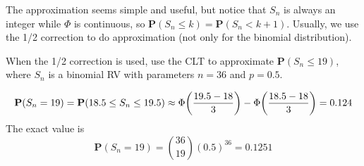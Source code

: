 \documentclass[device=normal, lang=en]{elegantbook}
\numberwithin{equation}{section}
\begin{document}
The approximation seems simple and useful, but notice that $S_n$ is always an integer while $\Phi$ is continuous, so $\mathbf{P}(S_n \leq k) = \mathbf{P}(S_n < k + 1)$. Usually, we use the 1/2 correction to do approximation (not only for the binomial distribution).
\begin{example}
    When the 1/2 correction is used, use the CLT to approximate $\mathbf{P}(S_n \leq 19)$, where $S_n$ is a binomial RV with parameters $n = 36$ and $p = 0.5$.
\end{example}
\begin{solution}
    \begin{equation}
        \mathbf{P}(S_n = 19) = \mathbf{P}(18.5 \leq S_n \leq 19.5) \approx \Phi\qty(\frac{19.5 - 18}{3}) - \Phi\qty(\frac{18.5 - 18}{3}) = 0.124
    \end{equation}
    The exact value is
    \begin{equation}
        \mathbf{P}(S_n = 19) = \binom{36}{19} (0.5)^{36} = 0.1251
    \end{equation}
\end{solution}

\appendix

\end{document}

